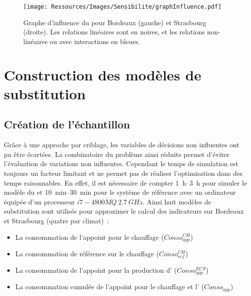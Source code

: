 \begin{figure}
    \centering
    \texttt{[image: Ressources/Images/Sensibilite/graphInfluence.pdf]}
    \caption[Graphe d’influence du  pour Bordeaux et Strasbourg]
            {Graphe d’influence du  pour Bordeaux (gauche) et Strasbourg (droite). Les
             relations linéaires sont en noires, et les relations non-linéaires ou
             avec interactions en bleues.}
    \label{fig:graphe_influence_objectifs}
\end{figure}




\section{Construction des modèles de substitution} %
\label{sec:construction_des_modeles_de_substitutions}
\subsection{Création de l’échantillon} %
\label{sub:creation_de_l_echantillon}
Grâce à une approche par criblage, les variables de décisions non influentes ont pu être
écartées. La combinatoire du problème ainsi réduite permet d’éviter l’évaluation de variations non influentes.
Cependant le temps de simulation est toujours un facteur limitant et ne permet pas
de réaliser l’optimisation dans des temps raisonnables. En effet, il est nécessaire de
compter \SIrange{1}{3}{h} pour simuler le modèle du  et \SIrange{10}{30}{min} pour
le système de référence avec un ordinateur équipée d’un processeur $i7-4800MQ\  \SI{2.7}{GHz}$.
Ainsi huit modèles de substitution sont utilisés pour approximer le calcul des indicateurs
sur Bordeaux et Strasbourg (quatre par climat)~:
\begin{itemize}
  \item La consommation de l’appoint pour le chauffage ($Conso_{app}^{CH}$)
  \item La consommation de référence sur le chauffage ($Conso_{ref}^{CH}$)
  \item La consommation de l’appoint pour la production d’ ($Conso_{app}^{ECS}$)
  \item La consommation cumulée de l’appoint pour le chauffage et l’ ($Conso_{app}$)
\end{itemize}

